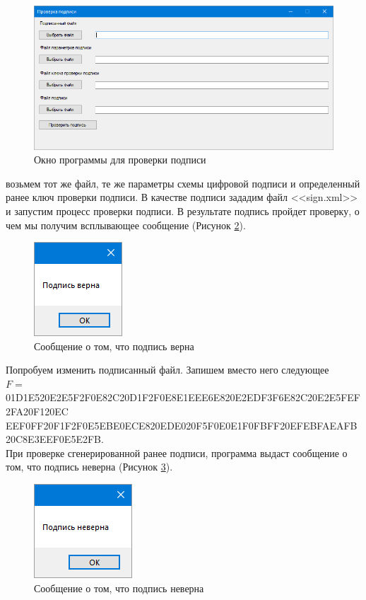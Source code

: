 \begin{figure}[H]
	\centering
	\includegraphics[width=0.9\linewidth]{inc/img/g5}
	\caption{Окно программы для проверки подписи}
	\label{fig:figG_5}
\end{figure}
\par
возьмем тот же файл, те же параметры схемы цифровой подписи и определенный ранее ключ проверки подписи. В качестве подписи зададим файл <<sign.xml>> и запустим процесс проверки подписи. В результате подпись пройдет проверку, о чем мы получим всплывающее сообщение (Рисунок \ref{fig:figG_6}).
\begin{figure}[H]
	\centering
	\includegraphics[width=0.2\linewidth]{inc/img/g6}
	\caption{Сообщение о том, что подпись верна}
	\label{fig:figG_6}
\end{figure}
\par
Попробуем изменить подписанный файл. Запишем вместо него следующее\\
{\ttfamily
	$F=\;$01D1E520E2E5F2F0E82C20D1F2F0E8E1EEE6E820E2EDF3F6E82C20E2E5FEF2FA20F120EC\\EEF0FF20F1F2F0E5EBE0ECE820EDE020F5F0E0E1F0FBFF20EFEBFAEAFB20C8E3EEF0E5E2FB.\\
}
При проверке сгенерированной ранее подписи, программа выдаст сообщение о том, что подпись неверна (Рисунок \ref{fig:figG_7}).
\begin{figure}[H]
	\centering
	\includegraphics[width=0.23\linewidth]{inc/img/g7}
	\caption{Сообщение о том, что подпись неверна}
	\label{fig:figG_7}
\end{figure}